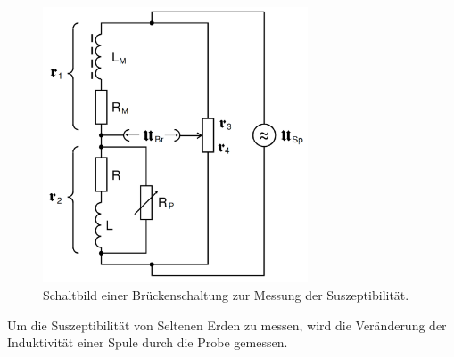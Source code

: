 \begin{figure}[H]
    \centering
    \includegraphics[width=0.7\textwidth]{img/bruecke.png}
    \caption{Schaltbild einer Brückenschaltung zur Messung der Suszeptibilität. \cite{V606}}
    \label{fig:bruecke}
\end{figure}

Um die Suszeptibilität von Seltenen Erden zu messen, wird die Veränderung der Induktivität einer Spule
durch die Probe gemessen.

